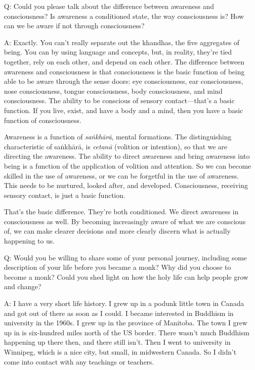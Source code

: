 \qaspace
Q: Could you please talk about the difference between awareness and
consciousness? Is awareness a conditioned state, the way consciousness
is? How can we be aware if not through consciousness?

\qaspace
A: Exactly. You can’t really separate out the khandhas, the five
aggregates of being. You can by using language and concepts, but, in
reality, they’re tied together, rely on each other, and depend on each
other. The difference between awareness and consciousness is that
consciousness is the basic function of being able to be aware through
the sense doors: eye consciousness, ear consciousness, nose
consciousness, tongue consciousness, body consciousness, and mind
consciousness. The ability to be conscious of sensory contact—that’s a
basic function. If you live, exist, and have a body and a mind, then you
have a basic function of consciousness.

Awareness is a function of \emph{saṅkhārā}, mental formations. The
distinguishing characteristic of saṅkhārā, is \emph{cetanā} (volition or
intention), so that we are directing the awareness. The ability to
direct awareness and bring awareness into being is a function of the
application of volition and attention. So we can become skilled in the
use of awareness, or we can be forgetful in the use of awareness. This
needs to be nurtured, looked after, and developed. Consciousness,
receiving sensory contact, is just a basic function.

That’s the basic difference. They’re both conditioned. We direct
awareness in consciousness as well. By becoming increasingly aware of
what we are conscious of, we can make clearer decisions and more clearly
discern what is actually happening to us.

\qaspace
Q: Would you be willing to share some of your personal journey,
including some description of your life before you became a monk? Why
did you choose to become a monk? Could you shed light on how the holy
life can help people grow and change?

\qaspace
A: I have a very short life history. I grew up in a podunk little town
in Canada and got out of there as soon as I could. I became interested
in Buddhism in university in the 1960s. I grew up in the province of
Manitoba. The town I grew up in is six-hundred miles north of the US
border. There wasn’t much Buddhism happening up there then, and there
still isn’t. Then I went to university in Winnipeg, which is a nice
city, but small, in midwestern Canada. So I didn’t come into contact
with any teachings or teachers.


